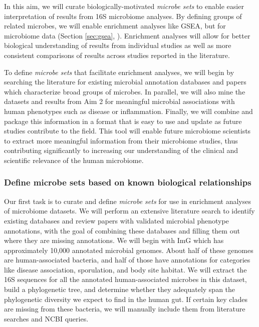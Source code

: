 \documentclass[12pt]{article}
\begin{document}
In this aim, we will curate biologically-motivated \textit{microbe 
sets} to enable easier interpretation of results from 16S microbiome 
analyses. By defining groups of related microbes, we 
will enable enrichment analyses like GSEA, but for microbiome data (Section \ref{sec:gsea}, 
\cite{subramanian-gsea-2005}). Enrichment analyses will allow for better 
biological understanding of results from individual studies as well as 
more consistent comparisons of results across studies reported in 
the literature.

To define \textit{microbe sets} that facilitate enrichment analyses, we will
begin by searching the literature for existing microbial annotation
databases and papers which characterize broad groups of microbes.
In parallel, we will also mine the datasets and results from Aim 2
for meaningful microbial associations with human phenotypes such as
disease or inflammation. Finally, we will combine and package this information
in a format that is easy to use and update as future studies contribute
to the field. This tool will enable future microbiome scientists to extract more
meaningful information from their microbiome studies, thus
contributing significantly to increasing our understanding of the
clinical and scientific relevance of the human microbiome.


\subsubsection{Define microbe sets based on known biological relationships}\label{sec:set_curation}

Our first task is to curate and define \textit{microbe sets} for use in enrichment analyses of 
microbiome datasets. We will perform an extensive literature search
to identify existing databases and review papers with validated microbial phenotype annotations, with the goal of
combining these databases and filling them out where they are missing annotations.
We will begin with ImG which has approximately 10,000 annotated microbial genomes. 
About half of these genomes are human-associated bacteria, 
and half of those have annotations for categories like disease 
association, sporulation, and body site habitat. 
We will extract the 16S sequences for all the annotated human-associated 
microbes in this dataset, build a phylogenetic tree, and determine whether 
they adequately span the phylogenetic diversity we expect to 
find in the human gut. If certain key clades are missing from these 
bacteria, we will manually include them from literature searches and 
NCBI queries.
\end{document}
